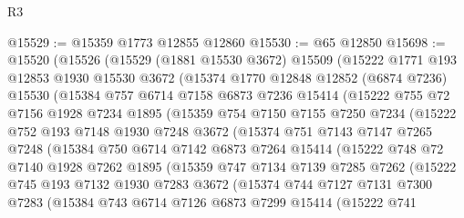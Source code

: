 \begin{lexlean}{R3}
\begin{coremodule}
@15529 := @15359 @1773 @12855 @12860
@15530 := @65 @12850
@15698 := @15520
    (@15526
      (@15529
        (@1881 @15530 @3672)
        @15509
        (@15222
          @1771
          @193
          @12853
          @1930
          @15530
          @3672
          (@15374
            @1770
            @12848
            @12852
            (@6874 @7236)
            @15530
            (@15384
              @757
              @6714
              @7158
              @6873
              @7236
              @15414
              (@15222
                @755
                @72
                @7156
                @1928
                @7234
                @1895
                (@15359
                  @754
                  @7150
                  @7155
                  @7250
                  @7234
                  (@15222
                    @752
                    @193
                    @7148
                    @1930
                    @7248
                    @3672
                    (@15374
                      @751
                      @7143
                      @7147
                      @7265
                      @7248
                      (@15384
                        @750
                        @6714
                        @7142
                        @6873
                        @7264
                        @15414
                        (@15222
                          @748
                          @72
                          @7140
                          @1928
                          @7262
                          @1895
                          (@15359
                            @747
                            @7134
                            @7139
                            @7285
                            @7262
                            (@15222
                              @745
                              @193
                              @7132
                              @1930
                              @7283
                              @3672
                              (@15374
                                @744
                                @7127
                                @7131
                                @7300
                                @7283
                                (@15384
                                  @743
                                  @6714
                                  @7126
                                  @6873
                                  @7299
                                  @15414
                                  (@15222
                                    @741

\end{coremodule}
\end{lexlean}
